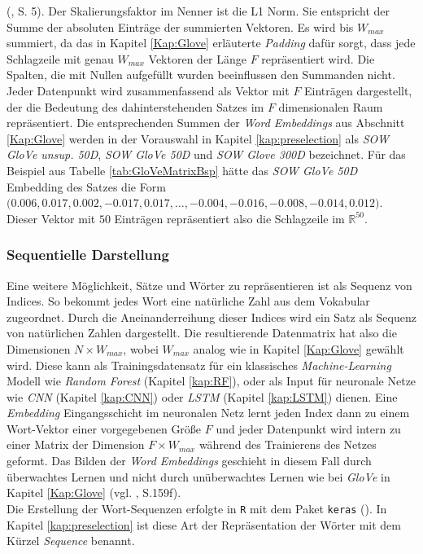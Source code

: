 \documentclass[a4paper,11pt]{article}
\begin{document}
(\cite{sumsWords}, S. 5). Der Skalierungsfaktor im Nenner ist die L1 Norm. Sie entspricht der Summe der absoluten Einträge der summierten Vektoren. Es wird bis $W_{max}$ summiert, da das in Kapitel \ref{Kap:Glove} erläuterte \textit{Padding} dafür sorgt, dass jede Schlagzeile mit genau $W_{max}$ Vektoren der Länge $F$ repräsentiert wird. Die Spalten, die mit Nullen aufgefüllt wurden beeinflussen den Summanden nicht.
Jeder Datenpunkt wird zusammenfassend als Vektor mit $F$ Einträgen dargestellt, der die Bedeutung des dahinterstehenden Satzes im $F$ dimensionalen Raum repräsentiert. Die entsprechenden Summen der \textit{Word Embeddings} aus Abschnitt \ref{Kap:Glove} werden in der Vorauswahl in Kapitel \ref{kap:preselection} als \textit{SOW GloVe unsup. 50D}, \textit{SOW GloVe 50D} und \textit{SOW Glove 300D} bezeichnet.
Für das Beispiel aus Tabelle \ref{tab:GloVeMatrixBsp} hätte das \textit{SOW GloVe 50D} Embedding des Satzes
 die Form \\
$\textbf{(}0.006, 0.017,  0.002, -0.017,  0.017, \dots , -0.004, -0.016, -0.008, -0.014, 0.012 \textbf{)}$. Dieser Vektor mit $50$ Einträgen repräsentiert also die Schlagzeile im $\mathbb{R}^{50}$.


\subsubsection{Sequentielle Darstellung} \label{Kap:Seq}

Eine weitere Möglichkeit, Sätze und Wörter zu repräsentieren ist als Sequenz von Indices. So bekommt jedes Wort eine natürliche Zahl aus dem Vokabular zugeordnet. Durch die Aneinanderreihung dieser Indices wird ein Satz als Sequenz von natürlichen Zahlen dargestellt. Die resultierende Datenmatrix hat also die Dimensionen $N \times W_{max}$, wobei $W_{max}$ analog wie in Kapitel \ref{Kap:Glove} gewählt wird. Diese kann als Trainingsdatensatz für ein klassisches \textit{Machine-Learning} Modell wie \textit{Random Forest} (Kapitel \ref{kap:RF}), oder als Input für neuronale Netze wie \textit{CNN} (Kapitel \ref{kap:CNN}) oder \textit{LSTM} (Kapitel \ref{kap:LSTM}) dienen. Eine \textit{Embedding} Eingangsschicht im neuronalen Netz lernt jeden Index dann zu einem Wort-Vektor einer vorgegebenen Größe $F$ und jeder Datenpunkt wird intern zu einer Matrix der Dimension $F \times W_{max}$ während des Trainierens des Netzes geformt. Das Bilden der \textit{Word Embeddings} geschieht in diesem Fall durch überwachtes Lernen und nicht durch unüberwachtes Lernen wie bei \textit{GloVe} in Kapitel \ref{Kap:Glove} (vgl. \cite{keras}, S.159f).\\
Die Erstellung der Wort-Sequenzen erfolgte in \texttt{R} mit dem Paket \texttt{keras} (\cite{kerasR}). In Kapitel \ref{kap:preselection} ist diese Art der Repräsentation der Wörter mit dem Kürzel \textit{Sequence} benannt. \\
\end{document}

